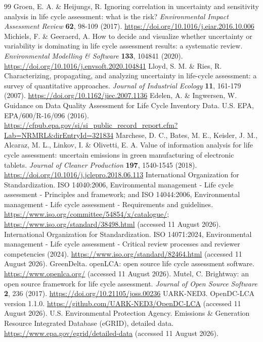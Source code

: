 \documentclass[review,12pt]{elsarticle}
\begin{document}
\begin{thebibliography}{99}
 Groen, E. A. \& Heijungs, R. Ignoring correlation in uncertainty and sensitivity analysis in life cycle assessment: what is the risk? \textit{Environmental Impact Assessment Review} \textbf{62}, 98-109 (2017). \url{https://doi.org/10.1016/j.eiar.2016.10.006}
 Michiels, F. \& Geeraerd, A. How to decide and visualize whether uncertainty or variability is dominating in life cycle assessment results: a systematic review. \textit{Environmental Modelling \& Software} \textbf{133}, 104841 (2020). \url{https://doi.org/10.1016/j.envsoft.2020.104841}
 Lloyd, S. M. \& Ries, R. Characterizing, propagating, and analyzing uncertainty in life-cycle assessment: a survey of quantitative approaches. \textit{Journal of Industrial Ecology} \textbf{11}, 161-179 (2007). \url{https://doi.org/10.1162/jiec.2007.1136}
 Edelen, A. \& Ingwersen, W. Guidance on Data Quality Assessment for Life Cycle Inventory Data. U.S. EPA, EPA/600/R-16/096 (2016). \url{https://cfpub.epa.gov/si/si_public_record_report.cfm?Lab=NRMRL&dirEntryId=321834}
 Marchese, D. C., Bates, M. E., Keisler, J. M., Alcaraz, M. L., Linkov, I. \& Olivetti, E. A. Value of information analysis for life cycle assessment: uncertain emissions in green manufacturing of electronic tablets. \textit{Journal of Cleaner Production} \textbf{197}, 1540-1545 (2018). \url{https://doi.org/10.1016/j.jclepro.2018.06.113}
 International Organization for Standardization. ISO 14040:2006, Environmental management - Life cycle assessment - Principles and framework; and ISO 14044:2006, Environmental management - Life cycle assessment - Requirements and guidelines. \url{https://www.iso.org/committee/54854/x/catalogue/;} \url{https://www.iso.org/standard/38498.html} (accessed 11 August 2026).
 International Organization for Standardization. ISO 14071:2024, Environmental management - Life cycle assessment - Critical review processes and reviewer competencies (2024). \url{https://www.iso.org/standard/82464.html} (accessed 11 August 2026).
 GreenDelta. openLCA: open source life cycle assessment software. \url{https://www.openlca.org/} (accessed 11 August 2026).
 Mutel, C. Brightway: an open source framework for life cycle assessment. \textit{Journal of Open Source Software} \textbf{2}, 236 (2017). \url{https://doi.org/10.21105/joss.00236}
 UARK-NED3. OpenDC-LCA version 1.1.0. \url{https://github.com/UARK-NED3/OpenDC-LCA} (accessed 11 August 2026).
 U.S. Environmental Protection Agency. Emissions \& Generation Resource Integrated Database (eGRID), detailed data. \url{https://www.epa.gov/egrid/detailed-data} (accessed 11 August 2026).

\end{thebibliography}
\end{document}
